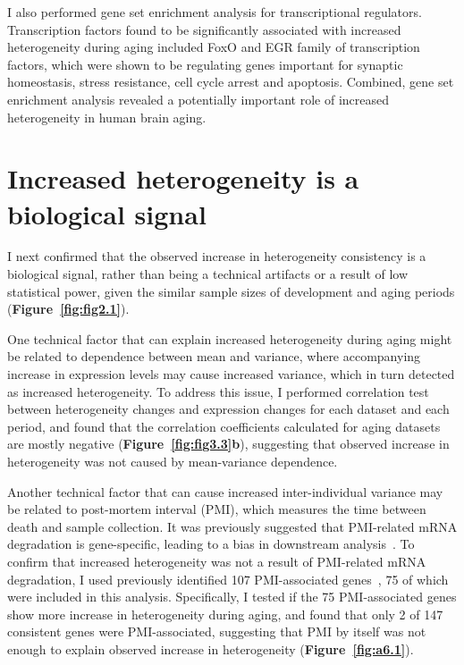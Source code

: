 I also performed gene set enrichment analysis for transcriptional regulators. Transcription factors found to be significantly associated with increased heterogeneity during aging included FoxO and EGR family of transcription factors, 
which were shown to be regulating genes important for synaptic homeostasis, stress resistance, cell cycle arrest and apoptosis.
Combined, gene set enrichment analysis revealed a potentially important role of increased heterogeneity in human brain aging.

\section{Increased heterogeneity is a biological signal}
I next confirmed that the observed increase in heterogeneity consistency is a biological signal, rather than being a technical artifacts or a result of low statistical power, 
given the similar sample sizes of development and aging periods (\textbf{Figure~\ref{fig:fig2.1}}).

One technical factor that can explain increased heterogeneity during aging might be related to dependence between mean and variance, 
where accompanying increase in expression levels may cause increased variance, which in turn detected as increased heterogeneity.
To address this issue, I performed correlation test between heterogeneity changes and expression changes for each dataset and each period, 
and found that the correlation coefficients calculated for aging datasets are mostly negative (\textbf{Figure~\ref{fig:fig3.3}b}), 
suggesting that observed increase in heterogeneity was not caused by mean-variance dependence.

Another technical factor that can cause increased inter-individual variance may be related to post-mortem interval (PMI), 
which measures the time between death and sample collection.
It was previously suggested that PMI-related mRNA degradation is gene-specific, leading to a bias in downstream analysis~\cite{Zhu2017}.
To confirm that increased heterogeneity was not a result of PMI-related mRNA degradation,
I used previously identified 107 PMI-associated genes~\cite{Zhu2017}, 75 of which were included in this analysis.
Specifically, I tested if the 75 PMI-associated genes show more increase in heterogeneity during aging,
and found that only 2 of 147 consistent genes were PMI-associated, 
suggesting that PMI by itself was not enough to explain observed increase in heterogeneity (\textbf{Figure~\ref{fig:a6.1}}).

